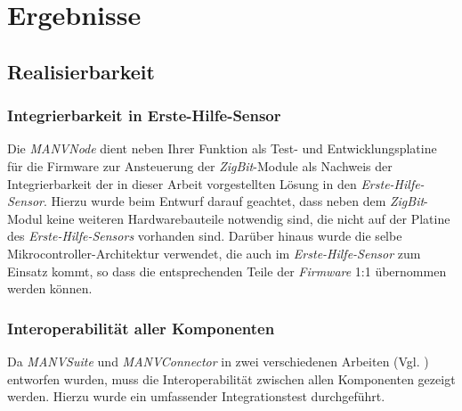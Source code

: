 


\chapter{Ergebnisse}
\section{Realisierbarkeit}
\subsection{Integrierbarkeit in Erste-Hilfe-Sensor}
Die \emph{MANVNode} dient neben Ihrer Funktion als Test- und Entwicklungsplatine für die Firmware zur 
Ansteuerung der \emph{ZigBit}-Module als Nachweis der Integrierbarkeit der in dieser Arbeit vorgestellten
Lösung in den \emph{Erste-Hilfe-Sensor}. Hierzu wurde beim Entwurf darauf geachtet, dass neben dem
\emph{ZigBit}-Modul keine weiteren Hardwarebauteile notwendig sind, die nicht auf der Platine des
\emph{Erste-Hilfe-Sensors} vorhanden sind. Darüber hinaus wurde die selbe Mikrocontroller-Architektur
verwendet, die auch im \emph{Erste-Hilfe-Sensor} zum Einsatz kommt, so dass die entsprechenden
Teile der \emph{Firmware} 1:1 übernommen werden können.

\subsection{Interoperabilität aller Komponenten}
Da \emph{MANVSuite} und \emph{MANVConnector} in zwei verschiedenen Arbeiten (Vgl. \cite{Jan}) 
entworfen wurden, muss die Interoperabilität zwischen allen Komponenten gezeigt werden. Hierzu
wurde ein umfassender Integrationstest durchgeführt.

